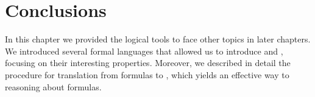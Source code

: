 
\section{Conclusions}
In this chapter we provided the logical tools to face other topics in later chapters. We introduced several formal languages that allowed us to introduce \LTLf and \LDLf, focusing on their interesting properties. Moreover, we described in detail the procedure for translation from \LLf formulas to \DFAs, which yields an effective way to reasoning about \LLf formulas.
